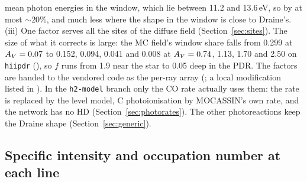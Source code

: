 mean photon energies in the window, which lie between 11.2 and 13.6\,eV, so
by at most $\sim$20\%, and much less where the shape in the window is close to
Draine's. (iii) One factor serves all the sites of the diffuse field
(Section~\ref{sec:sites}). The size of what it corrects is large: the MC
field's window share falls from 0.299 at $A_{V}=0.07$ to 0.152, 0.094, 0.041 and
0.008 at $A_{V}=0.74$, 1.13, 1.70 and 2.50 on \texttt{hiipdr}
(), so $f$ runs from 1.9 near the star to 0.05 deep in the PDR.
The factors are handed to the vendored code as the per-ray array
 (; a local
modification listed in ). In the \texttt{h2-model} branch
only the CO rate actually uses them: the \Htwo{} rate is replaced by the level
model, C photoionisation by MOCASSIN's own rate, and the network has no HD
(Section~\ref{sec:photorates}). The other photoreactions keep the Draine shape
(Section~\ref{sec:generic}).

\subsection{Specific intensity and occupation number at each \texorpdfstring{\Htwo}{H2} line}
\label{sec:eta}

